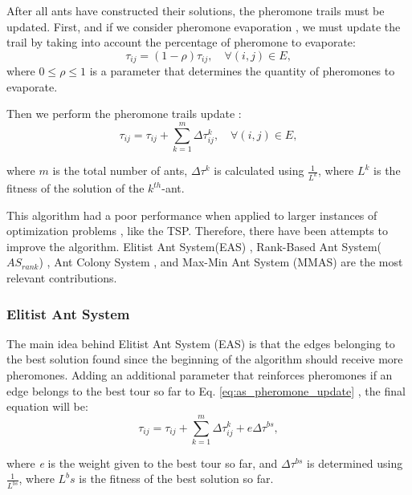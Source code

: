 					After all ants have constructed their solutions, the pheromone trails must be updated. First, and if we consider pheromone evaporation \cite{dorigo96}, we must update the trail by taking into account the percentage of pheromone to evaporate:
					\begin{equation}
						\tau_{ij} = (1 - \rho)\tau_{ij}, \quad \forall(i,j)\in E,
					\end{equation}
		\noindent where $0 \leq \rho \leq 1$ is a parameter that determines the quantity of pheromones to evaporate.

					Then we perform the  pheromone trails update \cite{dorigo96}:
					\begin{equation}
						\label{eq:as_pheromone_update}
						\tau_{ij} = \tau_{ij} + \sum_{k=1}^{m}\Delta\tau_{ij}^k, \quad \forall(i,j)\in E,
					\end{equation}


		\noindent where $m$ is the total number of ants, $\Delta\tau^k$ is calculated using $\frac{1} {L^k}$, where $L^k$ is the fitness of the solution of the $k^{th}$-ant.

					This algorithm had a poor performance when applied to larger instances of optimization problems \cite{acobook}, like the TSP. Therefore, there have been attempts to improve the algorithm. Elitist Ant System(EAS) \cite{dorigo92, dorigo96}, Rank-Based Ant System($AS_{rank}$) \cite{bullnheimer97}, Ant Colony System \cite{dorigo97}, and Max-Min Ant System (MMAS) \cite{stutzle00} are the most relevant contributions.

					\subsubsection*{Elitist Ant System}

					The main idea behind Elitist Ant System (EAS) \cite{dorigo92, dorigo96} is that the edges belonging to the best solution found since the beginning of the algorithm should receive more pheromones. Adding an additional parameter that reinforces pheromones if an edge belongs to the best tour so far to Eq. \eqref{eq:as_pheromone_update} \cite{dorigo92, dorigo96}, the final equation will be:
					\begin{equation}
						\label{eq:eas_pheromone_update}
						\tau_{ij} = \tau_{ij} + \sum_{k=1}^{m}\Delta\tau_{ij}^k + e\Delta\tau^{bs},
					\end{equation}

		\noindent where \emph{e} is the weight given to the best tour so far, and $\Delta\tau^{bs}$ is determined using $\frac{1} {L^{bs}}$, where ${L^bs}$ is the fitness of the best solution so far. 

